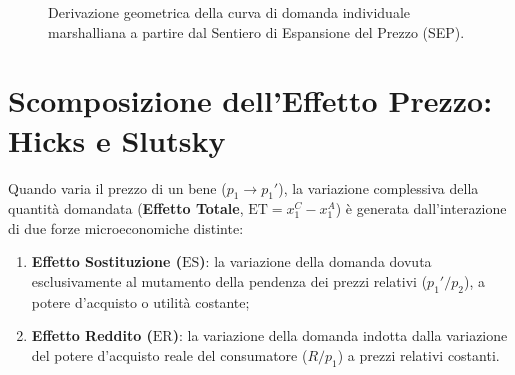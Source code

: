 \begin{figure}[htbp]
\caption{Derivazione geometrica della curva di domanda individuale marshalliana a partire dal Sentiero di Espansione del Prezzo (SEP).}
\label{fig:derivazione_domanda_sep}
\end{figure}

\section{Scomposizione dell'Effetto Prezzo: Hicks e Slutsky}

Quando varia il prezzo di un bene ($p_1 \to p_1'$), la variazione complessiva della quantità domandata (\textbf{Effetto Totale}, $\text{ET} = x_1^C - x_1^A$) è generata dall'interazione di due forze microeconomiche distinte:
\begin{enumerate}
    \item \textbf{Effetto Sostituzione ($\text{ES}$)}: la variazione della domanda dovuta esclusivamente al mutamento della pendenza dei prezzi relativi ($p_1'/p_2$), a potere d'acquisto o utilità costante;
    \item \textbf{Effetto Reddito ($\text{ER}$)}: la variazione della domanda indotta dalla variazione del potere d'acquisto reale del consumatore ($R/p_1$) a prezzi relativi costanti.
\end{enumerate}

